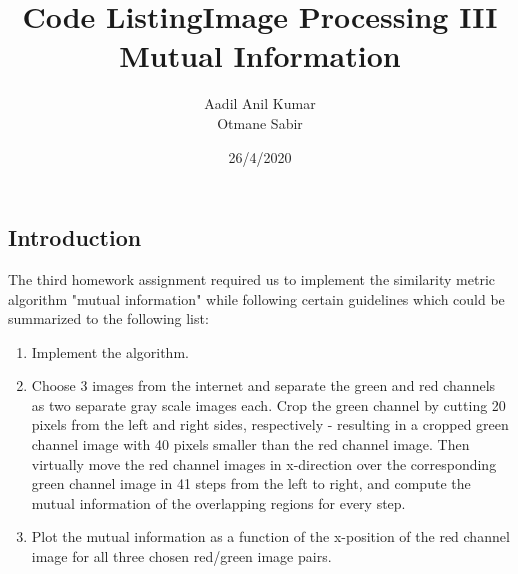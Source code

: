 \documentclass{article}
\title{Code Listing}
\date{ }
\begin{document}
\title{Image Processing III\\
Mutual Information}
\author{Aadil Anil Kumar \\
Otmane Sabir
}
\date{26/4/2020}
\maketitle
\vspace{10mm}
\begin{center}
\section*{Introduction}
\large
The third homework assignment required us to implement the similarity metric algorithm "mutual information" while following certain guidelines which could be summarized to the following list: 
\vspace{7mm}
\begin{enumerate}
    \item Implement the algorithm.
    \item Choose 3 images from the internet and separate the green and red channels as two separate gray scale images each. Crop the green channel by cutting 20 pixels from the left and right sides, respectively - resulting in a cropped green channel image with 40 pixels smaller than the red channel image. Then virtually move the red channel images in x-direction over the corresponding green channel image in 41 steps from the left to right, and compute the mutual information of the overlapping regions for every step.
    \item Plot the mutual information as a function of the x-position of the red channel image for all three chosen red/green image pairs.
\end{enumerate}


\end{center}
\newpage

\tableofcontents

\newpage
\end{document}

